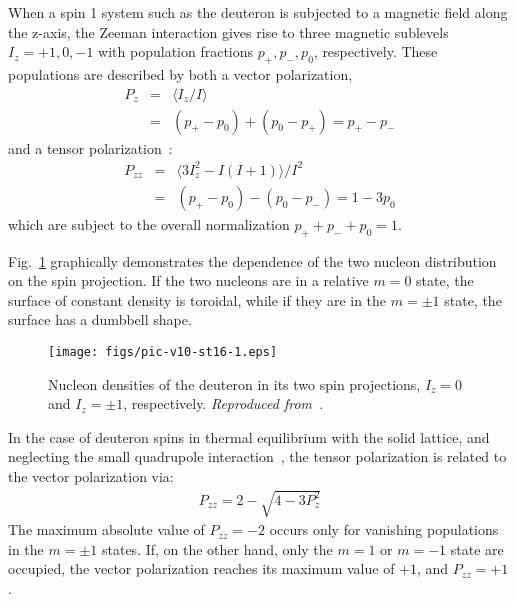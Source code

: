 When a  spin 1 system such as the deuteron is subjected to a magnetic field along the z-axis, the
Zeeman interaction gives rise to three magnetic sublevels $I_z = +1,0,-1$ with
population fractions $p_+,p_-, p_0$, respectively.
These populations are described by
both a vector  polarization,
%
\begin{eqnarray}
\nonumber
P_z &=&\langle I_z/I\rangle \\
    &=&(p_+ - p_0) + (p_0-p_+) = p_+ - p_-
\end{eqnarray}
and a tensor polarization~\cite{Meyer:1985dta}:
\begin{eqnarray}
\nonumber
P_{zz} &=& \langle 3 I_z^2 - I(I+1)\rangle/I^2   \\
&=&(p_+ - p_0) - (p_0-p_-) = 1 - 3 p_0
\end{eqnarray}
%
which are subject to the overall normalization $p_+ + p_- + p_0 = 1$.

Fig.~\ref{fig:deuteron} graphically demonstrates the dependence of the two nucleon distribution on the spin projection.  If the two nucleons are in a relative $m=0$ state, the surface of constant density is toroidal, while if they are in the $m=\pm 1$ state, the surface has a dumbbell shape.

\begin{figure}
\centering
\texttt{[image: figs/pic-v10-st16-1.eps]}
\caption{\label{fig:deuteron}
Nucleon densities of the deuteron in its two spin projections, $I_z=0$ and $I_z=\pm 1$, respectively.
{\it Reproduced from~\cite{Carlson:1997qn,Forest:1996kp}}.
}
\end{figure}

In the case of deuteron spins in thermal equilibrium with the solid lattice, and neglecting the small quadrupole interaction~\cite{Meyer:1985dta}, the tensor polarization is related to  the vector polarization via:
\begin{eqnarray}
\label{TENSORVECTOR}
P_{zz}= 2 - \sqrt{4-3 P_z^2}
\end{eqnarray}
The maximum absolute value of $P_{zz}=-2$  occurs only for vanishing populations in the $m=\pm 1$ states.
If, on the other hand, only the $m=1$ or $m=-1$ state are occupied, the vector polarization reaches its maximum value of $+1$, and $P_{zz}=+1$.  
